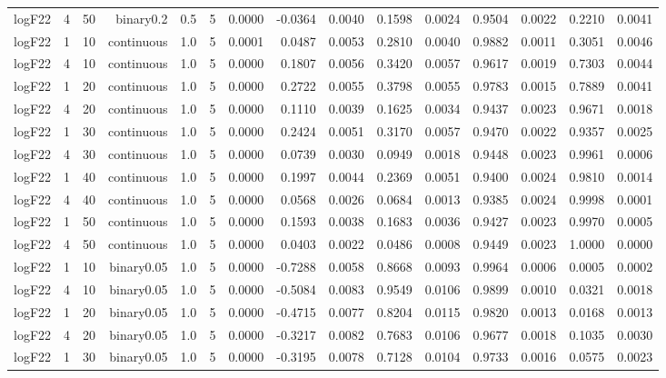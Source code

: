 \begin{longtable}{rrrrrrrrrrrrrrr}
  logF22 & 4 & 50 & binary0.2 & 0.5 & 5 & 0.0000 & -0.0364 & 0.0040 & 0.1598 & 0.0024 & 0.9504 & 0.0022 & 0.2210 & 0.0041 \\ 
  logF22 & 1 & 10 & continuous & 1.0 & 5 & 0.0001 & 0.0487 & 0.0053 & 0.2810 & 0.0040 & 0.9882 & 0.0011 & 0.3051 & 0.0046 \\ 
  logF22 & 4 & 10 & continuous & 1.0 & 5 & 0.0000 & 0.1807 & 0.0056 & 0.3420 & 0.0057 & 0.9617 & 0.0019 & 0.7303 & 0.0044 \\ 
  logF22 & 1 & 20 & continuous & 1.0 & 5 & 0.0000 & 0.2722 & 0.0055 & 0.3798 & 0.0055 & 0.9783 & 0.0015 & 0.7889 & 0.0041 \\ 
  logF22 & 4 & 20 & continuous & 1.0 & 5 & 0.0000 & 0.1110 & 0.0039 & 0.1625 & 0.0034 & 0.9437 & 0.0023 & 0.9671 & 0.0018 \\ 
  logF22 & 1 & 30 & continuous & 1.0 & 5 & 0.0000 & 0.2424 & 0.0051 & 0.3170 & 0.0057 & 0.9470 & 0.0022 & 0.9357 & 0.0025 \\ 
  logF22 & 4 & 30 & continuous & 1.0 & 5 & 0.0000 & 0.0739 & 0.0030 & 0.0949 & 0.0018 & 0.9448 & 0.0023 & 0.9961 & 0.0006 \\ 
  logF22 & 1 & 40 & continuous & 1.0 & 5 & 0.0000 & 0.1997 & 0.0044 & 0.2369 & 0.0051 & 0.9400 & 0.0024 & 0.9810 & 0.0014 \\ 
  logF22 & 4 & 40 & continuous & 1.0 & 5 & 0.0000 & 0.0568 & 0.0026 & 0.0684 & 0.0013 & 0.9385 & 0.0024 & 0.9998 & 0.0001 \\ 
  logF22 & 1 & 50 & continuous & 1.0 & 5 & 0.0000 & 0.1593 & 0.0038 & 0.1683 & 0.0036 & 0.9427 & 0.0023 & 0.9970 & 0.0005 \\ 
  logF22 & 4 & 50 & continuous & 1.0 & 5 & 0.0000 & 0.0403 & 0.0022 & 0.0486 & 0.0008 & 0.9449 & 0.0023 & 1.0000 & 0.0000 \\ 
  logF22 & 1 & 10 & binary0.05 & 1.0 & 5 & 0.0000 & -0.7288 & 0.0058 & 0.8668 & 0.0093 & 0.9964 & 0.0006 & 0.0005 & 0.0002 \\ 
  logF22 & 4 & 10 & binary0.05 & 1.0 & 5 & 0.0000 & -0.5084 & 0.0083 & 0.9549 & 0.0106 & 0.9899 & 0.0010 & 0.0321 & 0.0018 \\ 
  logF22 & 1 & 20 & binary0.05 & 1.0 & 5 & 0.0000 & -0.4715 & 0.0077 & 0.8204 & 0.0115 & 0.9820 & 0.0013 & 0.0168 & 0.0013 \\ 
  logF22 & 4 & 20 & binary0.05 & 1.0 & 5 & 0.0000 & -0.3217 & 0.0082 & 0.7683 & 0.0106 & 0.9677 & 0.0018 & 0.1035 & 0.0030 \\ 
  logF22 & 1 & 30 & binary0.05 & 1.0 & 5 & 0.0000 & -0.3195 & 0.0078 & 0.7128 & 0.0104 & 0.9733 & 0.0016 & 0.0575 & 0.0023 \\ 

\end{longtable}

